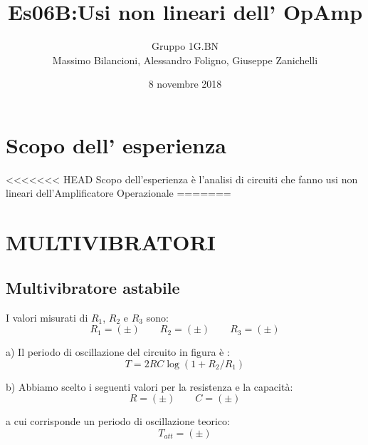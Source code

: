 \documentclass[10pt,a4paper]{article}
\author{Gruppo 1G.BN \\ Massimo Bilancioni, Alessandro Foligno, Giuseppe Zanichelli }
\title{Es06B:Usi non lineari dell’ OpAmp }
\begin{document}
	\date{8 novembre 2018}
	\maketitle
	
	
	\section*{Scopo dell' esperienza}
<<<<<<< HEAD
	Scopo dell'esperienza è l'analisi di circuiti che fanno usi non lineari dell'Amplificatore Operazionale
=======



\section{}


\section{ MULTIVIBRATORI }


\subsection{Multivibratore astabile}
I valori misurati di $R_1$, $R_2$ e $R_3$ sono:
\[ R_1 = ( \pm ) \qquad  R_2 = ( \pm ) \qquad   R_3 = ( \pm ) \]

a)  Il periodo di oscillazione del circuito in figura è : \[ T = 2 RC \log( 1+ R_2/R_1)\]





b) Abbiamo scelto i seguenti valori per la resistenza e la capacità:
\[ R = ( \pm ) \qquad   C = (\pm ) \]

a cui corrisponde un periodo di oscillazione teorico:
\[T_{att}= (\pm )\]
\end{document}
